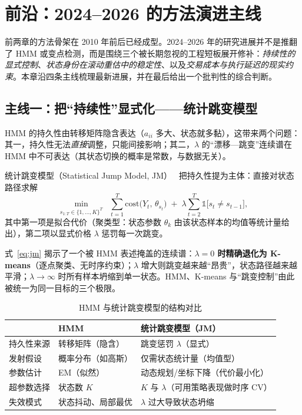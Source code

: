 
\section{前沿：2024--2026 的方法演进主线}
\label{sec:frontier}

前两章的方法骨架在 2010 年前后已经成型。2024--2026 年的研究进展并不是推翻了 HMM 或变点检测，而是围绕三个被长期忽视的工程短板展开修补：\emph{持续性的显式控制}、\emph{状态身份在滚动重估中的稳定性}、以及\emph{交易成本与执行延迟的现实约束}。本章沿四条主线梳理最新进展，并在最后给出一个批判性的综合判断。

\subsection{主线一：把“持续性”显式化——统计跳变模型}

HMM 的持久性由转移矩阵隐含表达（$a_{ii}$ 多大、状态就多黏），这带来两个问题：其一，持久性无法\emph{直接}调整，只能间接影响；其二，$\lambda$ 的“漂移—跳变”连续谱在 HMM 中不可表达（其状态切换的概率是常数，与数据无关）。

统计跳变模型（Statistical Jump Model, JM）~\cite{shu2024a,shu2024b} 把持久性提为主体：直接对状态路径求解
\begin{equation}
\min_{s_{1:T} \in \{1,\dots,K\}^T}
\;\; \sum_{t=1}^{T} \mathrm{cost}\big(Y_t,\, \theta_{s_t}\big)
\;+\; \lambda \sum_{t=2}^{T} \mathbb{1}\big[s_t \neq s_{t-1}\big],
\label{eq:jm}
\end{equation}
其中第一项是拟合代价（聚类型：状态参数 $\theta_k$ 由该状态样本的均值等统计量给出），第二项以显式价格 $\lambda$ 惩罚每一次跳变。

式~\eqref{eq:jm} 揭示了一个被 HMM 表述掩盖的连续谱：\textbf{$\lambda = 0$ 时精确退化为 K-means}（逐点聚类、无时序约束）；$\lambda$ 增大则跳变越来越“昂贵”，状态路径越来越平滑；$\lambda \to \infty$ 时所有样本坍缩到单一状态。HMM、K-means 与“跳变控制”由此被统一为同一目标的三个极限。

\begin{table}[htbp]
\centering
\footnotesize
\begin{tabular}{>{\raggedright\arraybackslash}p{2.2cm}>{\raggedright\arraybackslash}p{5.0cm}>{\raggedright\arraybackslash}p{4.6cm}}
\toprule
& \textbf{HMM} & \textbf{统计跳变模型（JM）} \\
\midrule
持久性来源 & 转移矩阵（隐含） & 跳变惩罚 $\lambda$（显式） \\
发射假设 & 概率分布（如高斯） & 仅需状态统计量（均值型） \\
参数估计 & EM（似然） & 动态规划/坐标下降（代价最小化） \\
超参数选择 & 状态数 $K$ & $K$ 与 $\lambda$（可用策略表现做时序 CV） \\
失效模式 & 状态抖动、局部最优 & $\lambda$ 过大导致状态坍缩 \\
\bottomrule
\end{tabular}
\caption{HMM 与统计跳变模型的结构对比}
\label{tab:hmm-vs-jm}
\end{table}


